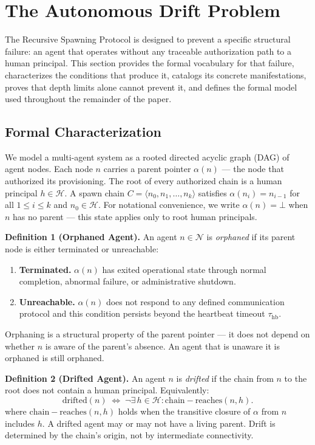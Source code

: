 \section{The Autonomous Drift Problem}
\label{sec:rs-drift}

The Recursive Spawning Protocol is designed to prevent a specific structural failure: an agent that operates without any traceable authorization path to a human principal. This section provides the formal vocabulary for that failure, characterizes the conditions that produce it, catalogs its concrete manifestations, proves that depth limits alone cannot prevent it, and defines the formal model used throughout the remainder of the paper.

\subsection{Formal Characterization}
\label{sec:rs-drift-formal}

We model a multi-agent system as a rooted directed acyclic graph (DAG) of agent nodes. Each node $n$ carries a parent pointer $\alpha(n)$ — the node that authorized its provisioning. The root of every authorized chain is a human principal $h \in \mathcal{H}$. A spawn chain $C = \langle n_0, n_1, \ldots, n_k \rangle$ satisfies $\alpha(n_i) = n_{i-1}$ for all $1 \leq i \leq k$ and $n_0 \in \mathcal{H}$. For notational convenience, we write $\alpha(n) = \bot$ when $n$ has no parent — this state applies only to root human principals.

\medskip
\noindent\textbf{Definition 1 (Orphaned Agent).}
An agent $n \in \mathcal{N}$ is \emph{orphaned} if its parent node is either terminated or unreachable:
\begin{enumerate}
  \item[(a)] \textbf{Terminated.} $\alpha(n)$ has exited operational state through normal completion, abnormal failure, or administrative shutdown.
  \item[(b)] \textbf{Unreachable.} $\alpha(n)$ does not respond to any defined communication protocol and this condition persists beyond the heartbeat timeout $\tau_{\mathrm{hb}}$.
\end{enumerate}
Orphaning is a structural property of the parent pointer — it does not depend on whether $n$ is aware of the parent's absence. An agent that is unaware it is orphaned is still orphaned.

\medskip
\noindent\textbf{Definition 2 (Drifted Agent).}
An agent $n$ is \emph{drifted} if the chain from $n$ to the root does not contain a human principal. Equivalently:
\begin{equation}
\mathrm{drifted}(n) \;\Longleftrightarrow\; \neg\exists\, h \in \mathcal{H} : \mathrm{chain-reaches}(n, h).
\label{eq:rs-drifted-def}
\end{equation}
where $\mathrm{chain-reaches}(n, h)$ holds when the transitive closure of $\alpha$ from $n$ includes $h$. A drifted agent may or may not have a living parent. Drift is determined by the chain's origin, not by intermediate connectivity.

